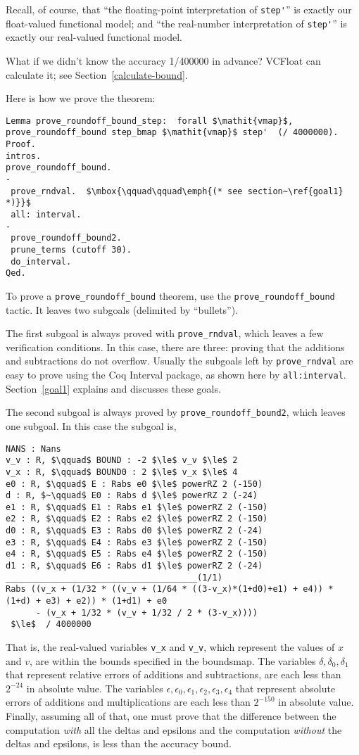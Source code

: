\documentclass[article]{memoir}
\begin{document}
Recall, of course, that ``the floating-point interpretation of \lstinline{step'}'' is exactly our float-valued functional model;
and ``the real-number interpretation of \lstinline{step'}''
is exactly our real-valued functional model.

What if we didn't know the accuracy 1/400000 in advance?
VCFloat can calculate it; see Section~\ref{calculate-bound}.

Here is how we prove the theorem:
\begin{lstlisting}
Lemma prove_roundoff_bound_step:  forall $\mathit{vmap}$, prove_roundoff_bound step_bmap $\mathit{vmap}$ step'  (/ 4000000).
Proof.
intros.
prove_roundoff_bound.
-
 prove_rndval.  $\mbox{\qquad\qquad\emph{(* see section~\ref{goal1} *)}}$
 all: interval.
- 
 prove_roundoff_bound2.
 prune_terms (cutoff 30).
 do_interval.
Qed.
\end{lstlisting}
To prove a \lstinline{prove_roundoff_bound} theorem,
use the \lstinline{prove_roundoff_bound} tactic.
It leaves two subgoals (delimited by ``bullets'').

The first subgoal is always proved with \lstinline{prove_rndval},
which leaves a few verification conditions.
In this case, there are three: proving that the additions
and subtractions do not overflow.  Usually the subgoals
left by \lstinline{prove_rndval} are easy to prove using the Coq
Interval package, as shown here by \lstinline{all:interval}.
Section~\ref{goal1} explains and discusses these goals.

The second subgoal
is always proved by
\lstinline{prove_roundoff_bound2}, which leaves
one subgoal.  In this case the subgoal is,

\begin{lstlisting}
NANS : Nans
v_v : R, $\qquad$ BOUND : -2 $\le$ v_v $\le$ 2
v_x : R, $\qquad$ BOUND0 : 2 $\le$ v_x $\le$ 4
e0 : R, $\qquad$ E : Rabs e0 $\le$ powerRZ 2 (-150)
d : R, $~\qquad$ E0 : Rabs d $\le$ powerRZ 2 (-24)
e1 : R, $\qquad$ E1 : Rabs e1 $\le$ powerRZ 2 (-150)
e2 : R, $\qquad$ E2 : Rabs e2 $\le$ powerRZ 2 (-150)
d0 : R, $\qquad$ E3 : Rabs d0 $\le$ powerRZ 2 (-24)
e3 : R, $\qquad$ E4 : Rabs e3 $\le$ powerRZ 2 (-150)
e4 : R, $\qquad$ E5 : Rabs e4 $\le$ powerRZ 2 (-150)
d1 : R, $\qquad$ E6 : Rabs d1 $\le$ powerRZ 2 (-24)
______________________________________(1/1)
Rabs ((v_x + (1/32 * ((v_v + (1/64 * ((3-v_x)*(1+d0)+e1) + e4)) * (1+d) + e3) + e2)) * (1+d1) + e0
      - (v_x + 1/32 * (v_v + 1/32 / 2 * (3-v_x))))
 $\le$  / 4000000
\end{lstlisting}
\label{stage2proofgoal}
That is, the real-valued variables \lstinline{v_x} and \lstinline{v_v},
which represent the values of $x$ and $v$, are within the bounds
specified in the boundsmap.  The variables 
$\delta,\delta_0,\delta_1$ that represent
relative errors of additions and subtractions, are each less than
$2^{-24}$ in absolute value.  The variables 
$\epsilon,\epsilon_0,\epsilon_1,\epsilon_2,\epsilon_3,\epsilon_4$ that
represent absolute errors of additions and multiplications
are each less than $2^{-150}$ in absolute value.
Finally, assuming all of that, one must prove that the
difference between the computation \emph{with} all the
deltas and epsilons and the computation \emph{without}
the deltas and epsilons, is less than the accuracy bound.
\end{document}
